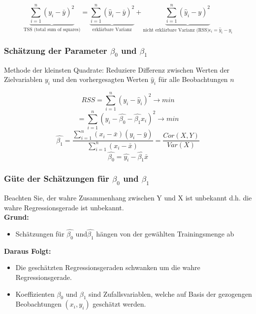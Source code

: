 \documentclass[10pt]{report}
\theoremstyle{definition}
\begin{document}
\[ \underbrace{\sum\limits_{i=1}^n (y_i - \bar{y})^2}_{\text{TSS (total sum of squares)}} = \underbrace{\sum\limits_{i=1}^n (\hat{y}_i - \bar{y})^2}_{\text{erklärbare Varianz}} + \underbrace{\sum\limits_{i=1}^n (\hat{y}_i - y)^2}_{\text{nicht erklärbare Varianz (RSS)} \epsilon_i = \hat{y}_i -y_i} \]

\subsubsection{Schätzung der Parameter $\beta_0$ und $\beta_1$}
Methode der kleinsten Quadrate: Reduziere Differenz zwischen Werten der Zielvariablen $y_i$ und den vorhergesagten Werten $\hat{y}_i$ für alle Beobachtungen $n$

\[ RSS = \sum\limits_{i=1}^n (y_i -\hat{y}_i)^2 \rightarrow min \]
\[ = \sum\limits_{i=1}^n (y_i -\hat{\beta_0} - \hat{\beta_1} x_i)^2 \rightarrow min \]
\[ \hat{\beta_1} = \frac{\sum\limits_{i=1}^n(x_i - \bar{x})(y_i - \bar{y})}{\sum\limits_{i=1}^n(x_i - \bar{x})} = 
\frac{Cor(X,Y)}{Var(X)} \]
\[ \hat{\beta_0} = \hat{y_i} - \hat{\beta_1}\bar{x} \]
	
\subsubsection{Güte der Schätzungen für $\beta_0$ und $\beta_1$}
Beachten Sie, der wahre Zusammenhang zwischen Y und X ist unbekannt d.h. die wahre Regressionsgerade ist unbekannt. \\
\textbf{Grund:} 
\begin{itemize}
	\item Schätzungen für $\hat{\beta_0}$ und$ \hat{\beta_1}$ hängen von der gewählten Trainingsmenge ab\\
\end{itemize}
\textbf{Daraus Folgt:} 
\begin{itemize}
	\item Die geschätzten Regressionsgeraden schwanken um die wahre Regressionsgerade.
	\item Koeffizienten $\beta_0$ und $\beta_1$ sind Zufallsvariablen, welche auf Basis der gezogengen Beobachtungen $(x_i,y_i)$ geschätzt werden.
\end{itemize}


\end{document}
